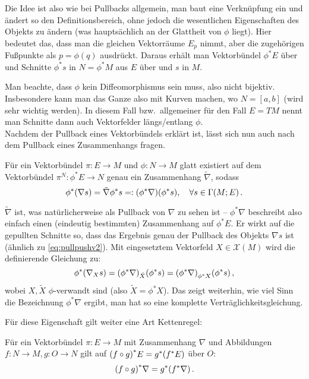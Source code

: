 \documentclass[../H_Analysis_main.tex]{subfiles}
\begin{document}
Die Idee ist also wie bei Pullbacks allgemein, man baut eine Verknüpfung ein und ändert so den Definitionsbereich, ohne jedoch die wesentlichen Eigenschaften des Objekts zu ändern (was hauptsächlich an der Glattheit von $\phi$ liegt). Hier bedeutet das, dass man die gleichen Vektorräume $E_p$ nimmt, aber die zugehörigen Fußpunkte als $p = \phi(q)$ ausdrückt. Daraus erhält man Vektorbündel $\phi^* E$ über und Schnitte $\phi^* s$ in $N = \phi^* M$ aus $E$ über und $s$ in $M$.

Man beachte, dass $\phi$ kein Diffeomorphismus sein muss, also nicht bijektiv. Insbesondere kann man das Ganze also mit Kurven machen, wo $N = [a, b]$ (wird sehr wichtig werden). In diesem Fall bzw.~allgemeiner für den Fall $E = TM$ nennt man Schnitte dann auch Vektorfelder längs/entlang $\phi$.\\


Nachdem der Pullback eines Vektorbündels erklärt ist, lässt sich nun auch nach dem Pullback eines Zusammenhangs fragen.

\begin{satz}
Für ein Vektorbündel $\pi: E \rightarrow M$ und $\phi: N \rightarrow M$ glatt existiert auf dem Vektorbündel $\pi^N: \phi^* E \rightarrow N$ genau ein Zusammenhang $\tilde{\nabla}$, sodass
\begin{equation}
\phi^* \qty(\nabla s) = \tilde{\nabla} \phi^* s =: \qty(\phi^* \nabla) \qty(\phi^* s), \quad \forall s \in \Gamma(M; E) \, .
\end{equation}
\end{satz}

$\tilde{\nabla}$ ist, was natürlicherweise als Pullback von $\nabla$ zu sehen ist -- $\phi^* \nabla$ beschreibt also einfach einen (eindeutig bestimmten) Zusammenhang auf $\phi^* E$. Er wirkt auf die gepullten Schnitte so, dass das Ergebnis genau der Pullback des Objekts $\nabla s$ ist (ähnlich zu \eqref{eq:pullpushv2}). Mit eingesetztem Vektorfeld $X \in \mathcal{X}(M)$ wird die definierende Gleichung zu:
\begin{equation}
\phi^* \qty(\nabla_X s) = \qty(\phi^* \nabla)_{\tilde{X}} \qty(\phi^* s) = \qty(\phi^* \nabla)_{\phi^* X} \qty(\phi^* s) \, ,
\end{equation}
wobei $X, \tilde{X}$ $\phi$-verwandt sind (also $\tilde{X} = \phi^* X$). Das zeigt weiterhin, wie viel Sinn die Bezeichnung $\phi^* \nabla$ ergibt, man hat so eine komplette Verträglichkeitsgleichung.

Für diese Eigenschaft gilt weiter eine Art Kettenregel:
\begin{satz}
Für ein Vektorbündel $\pi: E \rightarrow M$ mit Zusammenhang $\nabla$ und Abbildungen $f: N \rightarrow M, g: O \rightarrow N$ gilt auf $\qty(f \circ g)^* E = g^* \qty(f^* E)$ über $O$:
\begin{equation}
\qty(f \circ g)^* \nabla = g^* \qty(f^* \nabla) \, .
\end{equation}
\end{satz}
\end{document}
